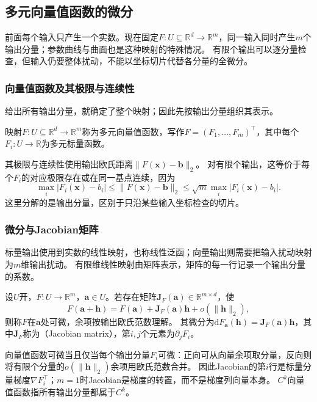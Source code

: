 \FloatBarrier

\subsection{多元向量值函数的微分}

前面每个输入只产生一个实数。现在固定$F:U\subseteq\mathbb R^d\to\mathbb R^m$，同一输入同时产生$m$个输出分量；参数曲线与曲面也是这种映射的特殊情况。
有限个输出可以逐分量检查，但输入仍要整体扰动，不能以坐标切片代替各分量的全微分。

\subsubsection{向量值函数及其极限与连续性}

给出所有输出分量，就确定了整个映射；因此先按输出分量组织其表示。
\begin{definition}[多元向量值函数]
\label{def:multivariable-vector-function}
映射$F:U\subseteq\mathbb R^d\to\mathbb R^m$称为多元向量值函数，写作$F=(F_1,\ldots,F_m)^\top$，其中每个$F_i:U\to\mathbb R$为多元标量函数。
\end{definition}
其极限与连续性使用输出欧氏距离$\lVert F(\bm x)-\bm b\rVert_2$。
对有限个输出，这等价于每个$F_i$的对应极限存在或在同一基点连续，因为
\[
 \max_i|F_i(\bm x)-b_i|\leq\lVert F(\bm x)-\bm b\rVert_2
 \leq\sqrt m\max_i|F_i(\bm x)-b_i|.
\]
这里分解的是输出分量，区别于只沿某些输入坐标检查的切片。

\subsubsection{微分与Jacobian矩阵}

标量输出使用到实数的线性映射，也称线性泛函；向量输出则需要把输入扰动映射为$m$维输出扰动。
有限维线性映射由矩阵表示，矩阵的每一行记录一个输出分量的系数。
\begin{definition}[向量值函数的微分]
\label{def:multivariable-vector-differential}
设$U$开，$F:U\to\mathbb R^m$，$\bm a\in U$。若存在矩阵$\bm J_F(\bm a)\in\mathbb R^{m\times d}$，使
\begin{equation}
 F(\bm a+\bm h)=F(\bm a)+\bm J_F(\bm a)\bm h+o(\lVert\bm h\rVert_2),
\label{eq:analysis-jacobian-linearization}
\end{equation}
则称$F$在$\bm a$处可微，余项按输出欧氏范数理解。
其微分为$\mathrm dF_{\bm a}(\bm h)=\bm J_F(\bm a)\bm h$，其中$\bm J_F$称为（Jacobian matrix），第$i,j$个元素为$\partial_jF_i$。
\end{definition}
向量值函数可微当且仅当每个输出分量$F_i$可微：正向可从向量余项取分量，反向则将有限个分量的$o(\lVert\bm h\rVert_2)$余项用欧氏范数合并。
因此Jacobian的第$i$行是标量分量梯度$\nabla F_i^\top$；$m=1$时Jacobian是梯度的转置，而不是梯度列向量本身。
$C^k$向量值函数指所有输出分量都属于$C^k$。


